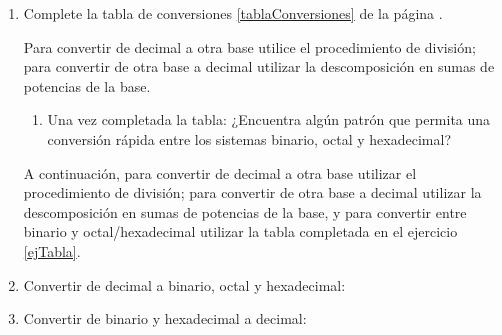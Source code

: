\documentclass[12pt]{article}
\begin{document}
\begin{enumerate}
\begin{enumerate}
        \item Complete la tabla de conversiones \ref{tablaConversiones} de la
            página \pageref{tablaConversiones}. \label{ejTabla}

            Para convertir de decimal a otra base utilice el procedimiento de
            división; para convertir de otra base a decimal utilizar la
            descomposición en sumas de potencias de la base.

            \begin{enumerate}

                \item Una vez completada la tabla: ¿Encuentra algún patrón que
                    permita una conversión rápida entre los sistemas binario,
                    octal y hexadecimal?

            \end{enumerate}

            A continuación, para convertir de decimal a otra base utilizar el
            procedimiento de división; para convertir de otra base a decimal
            utilizar la descomposición en sumas de potencias de la base, y
            para convertir entre binario y octal/hexadecimal utilizar la
            tabla completada en el ejercicio \ref{ejTabla}.

        \item Convertir de decimal a binario, octal y hexadecimal:


        \item Convertir de binario y hexadecimal a decimal:

\end{enumerate}
\end{enumerate}
\end{document}
